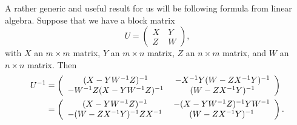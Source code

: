 \documentclass[10pt, oneside]{book}
\begin{document}
\begin{doublespace}
A rather generic and useful result for us will be following formula from linear algebra.   Suppose that we have a block matrix \begin{equation}
U = \left(\begin{array}{cc} X &\ Y \\ Z &\ W \end{array}\right),
\end{equation} with $X$ an $m\times m$ matrix, $Y$ an $m\times n$ matrix, $Z$ an $n\times m$ matrix, and $W$ an $n\times n$ matrix.   Then \begin{align}
U^{-1} &= \left(\begin{array}{cc}  (X-YW^{-1}Z)^{-1} &\  -X^{-1}Y(W-ZX^{-1}Y)^{-1} \\ -W^{-1}Z(X-YW^{-1}Z)^{-1} &\ (W-ZX^{-1}Y)^{-1}   \end{array}\right) \notag \\
&=   \left(\begin{array}{cc}  (X-YW^{-1}Z)^{-1} &\  -(X-YW^{-1}Z)^{-1}YW^{-1} \\ -(W-ZX^{-1}Y)^{-1}ZX^{-1} &\ (W-ZX^{-1}Y)^{-1}   \end{array}\right). 
\end{align}



\end{doublespace}
\end{document}

